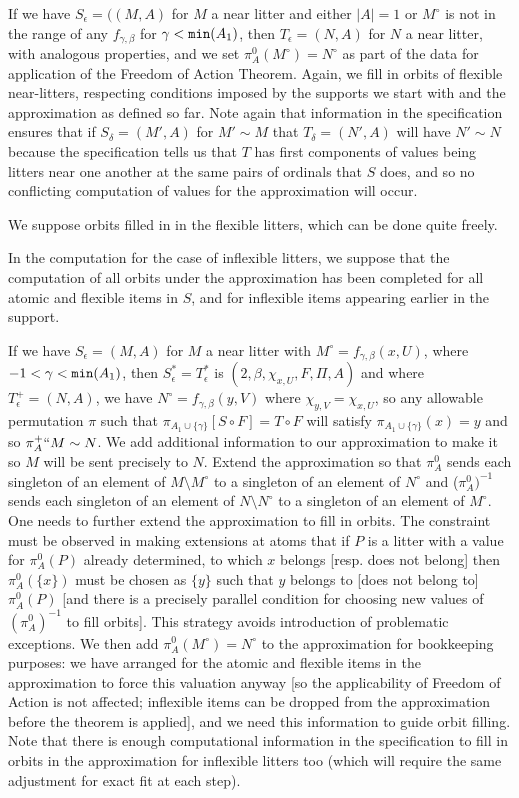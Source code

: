 \documentclass[112pt]{article}
\begin{document}
\begin{description}
If we have $S_\epsilon = ((M,A)$ for $M$ a near litter and either $|A|=1$ or $M^\circ$ is not in the range of any $f_{\gamma,\beta}$ for $\gamma<{\tt min}(A_1)$, then $T_\epsilon = (N,A)$ for $N$ a near litter, with analogous properties, and we set $\pi^0_A(M^\circ) = N^\circ$  as part of the data for application of the Freedom of Action Theorem.   Again, we fill in orbits of flexible near-litters, respecting conditions imposed by the supports we start with and the approximation as defined so far.  Note again
that information in the specification ensures that if $S_\delta = (M',A)$  for $M'\sim M$ that
$T_\delta = (N',A)$ will have $N' \sim N$ because the specification tells us that $T$ has first components of values being litters near one another at the same pairs of ordinals that $S$ does,
and so no conflicting computation of values for the approximation will occur.

We suppose orbits filled in in the flexible litters, which can be done quite freely.

In the computation for the case of inflexible litters, we suppose that the computation of all orbits under the approximation has been completed for all atomic and flexible items in $S$, and for inflexible items appearing earlier in the support.

If we have $S_\epsilon= (M,A)$ for $M$ a near litter with $M^\circ = f_{\gamma,\beta}(x,U)$, where $-1<\gamma<{\tt min}(A_1)$,
then $S^*_\epsilon=T^*_\epsilon$ is $(2,\beta,\chi_{x,U}, F,\Pi,A)$ and where $T^+_\epsilon=(N,A)$,  we have $N^\circ = f_{\gamma,\beta}(y,V)$
where $\chi_{y,V} = \chi_{x,U}$, so any allowable permutation $\pi$ such that $\pi_{A_1 \cup \{\gamma\}}[S \circ F] = T \circ F$ will satisfy $\pi_{A_1 \cup \{\gamma\}}(x) = y$ and  so $\pi^+_A``M \sim N$.
We add additional information to our approximation to make it so $M$ will be sent precisely to $N$.
Extend the approximation so that $\pi^0_{A}$ sends each singleton of an element of $M\setminus M^\circ$ to a singleton of an element of $N^\circ$ and ($\pi^0_A)^{-1}$ sends each singleton of an element of $N\setminus N^\circ$ to a singleton of an  element of $M^\circ$.  One needs to further extend the approximation to fill in orbits.  The constraint must be observed in making extensions at atoms  that if $P$ is a litter with a value for
$\pi^0_A(P)$ already determined, to which $x$ belongs [resp. does not belong] then $\pi^0_A(\{x\})$ must be chosen as $\{y\}$ such that
$y$ belongs to [does not belong to] $\pi^0_A(P)$ [and there is a precisely parallel condition for choosing new values of $(\pi^0_A)^{-1}$ to fill orbits].  This strategy avoids introduction of problematic exceptions.  We then add $\pi^0_A(M^\circ) = N^\circ$ to the approximation for bookkeeping purposes:  we have arranged for the atomic and flexible items in the approximation to force this valuation anyway [so the applicability of Freedom of Action is not affected; inflexible items can be dropped from the approximation before the theorem  is applied], and we need this information to guide orbit filling.
Note that there is enough computational information in the specification to fill in orbits in the approximation for inflexible litters too (which will require the same adjustment for exact fit at each step).


\end{description}
\end{document}
